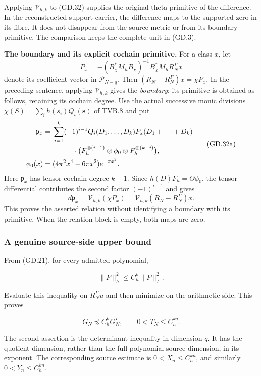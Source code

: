 Applying \(\mathcal V_{h,k}\) to (GD.32) supplies the original theta
primitive of the difference. In the reconstructed support carrier, the
difference maps to the supported zero in its fibre. It does not
disappear from the source metric or from its boundary primitive. The
comparison keeps the complete unit in (GD.3).

\textbf{The boundary and its explicit cochain primitive.}
For a class \(x\), let
\[
P_x=-(B_\chi^*M_hB_\chi)^{-1}B_\chi^*M_hR_N^\Gamma x
\]
denote its coefficient vector in \(\mathcal P_{N-q}\).
Then \((R_N-R_N^\Gamma)x=\chi P_x\).
In the preceding sentence, applying \(\mathcal V_{h,k}\) gives the
\emph{boundary}; its primitive is obtained as follows, retaining its
cochain degree. Use the actual successive monic divisions
\(\chi(S)=\sum_i h(s_i)Q_i(\mathbf s)\) of TVB.8 and put
\[
\begin{split}
\mathfrak p_x={}&\sum_{i=1}^k(-1)^{i-1}
 Q_i(D_1,\ldots,D_k)P_x(D_1+\cdots+D_k)\\
&\hspace{0.4in}\cdot
 \bigl(F_h^{\otimes(i-1)}\otimes\phi_0
                  \otimes F_h^{\otimes(k-i)}\bigr),\\
\phi_0(x)={}&(4\pi^2x^4-6\pi x^2)e^{-\pi x^2}.
\end{split} \tag{GD.32a}
\]
Here \(\mathfrak p_x\) has tensor cochain degree \(k-1\).
Since \(h(D)F_h=\Theta\phi_0\), the tensor differential contributes
the second factor \((-1)^{i-1}\) and gives
\[
d\mathfrak p_x=\mathcal V_{h,k}(\chi P_x)
              =\mathcal V_{h,k}(R_N-R_N^\Gamma)x. \tag{GD.32b}
\]
This proves the asserted relation without identifying a boundary with its
primitive. When the relation block is empty, both maps are zero.


\subsubsection{A genuine source-side upper
bound}\label{gammad-a-genuine-source-side-upper-bound}

From (GD.21), for every admitted polynomial,

\[
\|P\|_h^2\le C_h^k\|P\|_\Gamma^2.
\]

Evaluate this inequality on \(R_N^\Gamma u\) and then minimize on the
arithmetic side. This proves

\[
\boxed{
G_N\preceq C_h^kG_N^\Gamma,\qquad
0<T_N\le C_h^{kq}.
}                                                                   \tag{GD.33}
\]

The second assertion is the determinant inequality in dimension \(q\).
It has the quotient dimension, rather than the full polynomial-source
dimension, in its exponent. The corresponding source estimate is
\(0<X_n\le C_h^{kn}\), and similarly \(0<Y_n\le C_h^{kn}\).

